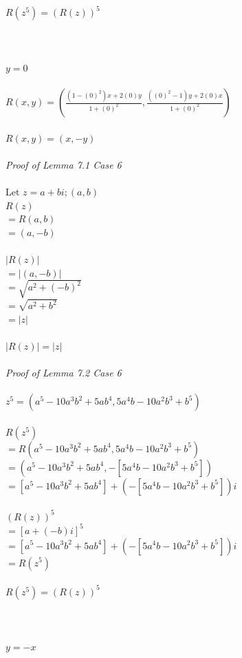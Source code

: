\documentclass{article}
\begin{document}
\\$R(z^5) = (R(z))^5$
\\
\\
\\
\\
\underline{$y=0$}                %
\\
\\
$R(x,y) = (\frac{(1-(0)^2)x+2(0)y}{1+(0)^2}, \frac{((0)^2-1)y+2(0)x}{1+(0)^2})$
\\
\\$R(x,y) = (x, -y)$
\\
\\\textit{Proof of Lemma 7.1 Case 6}
\\
\\Let $z=a+bi; (a,b)$
\\$R(z)$
\\$= R(a,b)$
\\$= (a, -b)$
\\
\\$|R(z)|$
\\$=|(a,-b)| $
\\$= \sqrt{a^2 + (-b)^2}$
\\$= \sqrt{a^2 + b^2}$
\\$= |z|$
\\
\\$|R(z)| = |z|$
\\
\\\textit{Proof of Lemma 7.2 Case 6}
\\
\\$z^5 = (a^5-10a^3b^2+5ab^4, 5a^4b-10a^2b^3+b^5)$
\\
\\$R(z^5)$
\\$= R(a^5-10a^3b^2+5ab^4, 5a^4b-10a^2b^3+b^5)$
\\$= (a^5-10a^3b^2+5ab^4, -[5a^4b-10a^2b^3+b^5])$
\\$= [a^5-10a^3b^2+5ab^4] + (-[5a^4b-10a^2b^3+b^5])i$
\\
\\$(R(z))^5$
\\$= [a+(-b)i]^5$
\\$= [a^5-10a^3b^2+5ab^4] + (-[5a^4b-10a^2b^3+b^5])i$
\\$= R(z^5)$
\\
\\$R(z^5) = (R(z))^5$
\\
\\
\\
\\
\underline{$y=-x$}                %
\end{document}
